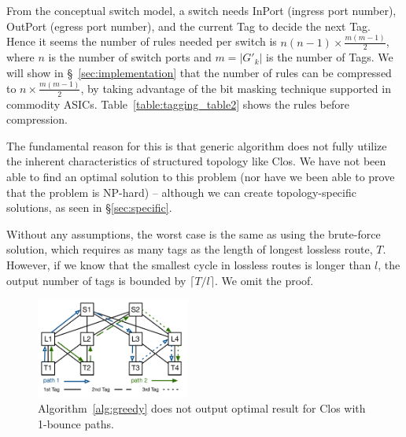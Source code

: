  From the conceptual switch model, a switch needs InPort 
(ingress port number), OutPort (egress port number), and the current Tag to decide the next Tag.
Hence it seems the number of rules needed per switch is $n(n-1)\times
\frac{m(m-1)}{2}$, where $n$ is the number of switch ports and $m=|G'_{k}|$ is
the number of Tags. We will show in \S~\ref{sec:implementation} that the number
of rules can be compressed to  $n\times \frac{m(m-1)}{2}$, by taking advantage
of the bit masking technique supported in commodity ASICs.
Table~\ref{table:tagging_table2} shows the rules before compression.



The fundamental reason for this is that generic algorithm does not fully utilize
the inherent characteristics of structured topology like Clos. We have not been
able to find an optimal solution to this problem (nor have we been able to prove
that the problem is NP-hard) -- although we can create topology-specific
solutions, as seen in \S\ref{sec:specific}. 


 Without
any assumptions, the worst case is the same as using the brute-force solution,
which requires as many tags as the length of longest lossless route, $T$.
However, if we know that the smallest cycle in lossless routes is longer than
$l$, the output number of tags is bounded by $\lceil T/l \rceil$. We omit the
proof.

\begin{figure}[t]
	\centering
	\includegraphics[width=0.45\textwidth] {figs/nonoptimal_example}
	\caption{Algorithm~\ref{alg:greedy} does not output optimal result for Clos with 1-bounce paths.}
	\label{fig:nonoptimal}
\end{figure}
